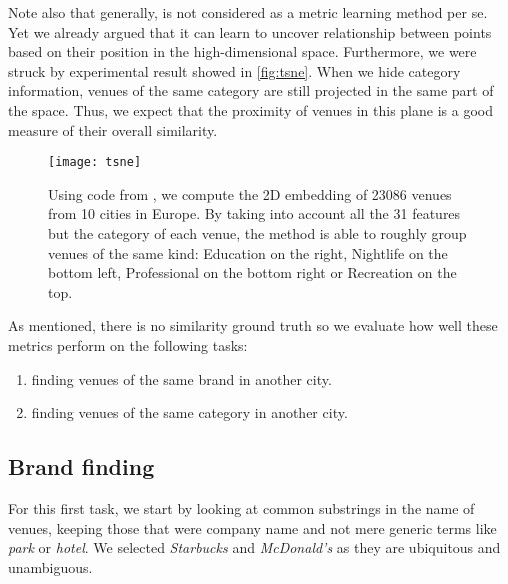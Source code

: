 Note also that generally, \tsne{} is not considered as a metric learning method
per se. Yet we already argued that it can learn to uncover relationship between
points based on their position in the high-dimensional space. Furthermore, we
were struck by experimental result showed in \autoref{fig:tsne}. When we hide
category information, venues of the same category are still projected in the
same part of the space. Thus, we expect that the proximity of venues in this
plane is a good measure of their overall similarity.

\begin{figure}[htpb]
	\centering
	\texttt{[image: tsne]}
	\caption[2D projection of European venues by t-SNE]{Using code from
		\cite{BarnesHut13}, we compute the 2D embedding of 23086 venues from 10 cities in
		Europe. By taking into account all the 31 features but the category of each
		venue, the method is able to roughly group venues of the same kind: Education
		on the right, Nightlife on the bottom left, Professional on the bottom right
	or Recreation on the top. \label{fig:tsne}}
\end{figure}

As mentioned, there is no similarity ground truth so we evaluate how well these
metrics perform on the following tasks:
\begin{enumerate}
	\item finding venues of the same brand in another city.
	\item finding venues of the same category in another city.
\end{enumerate}		

\subsection{Brand finding}
\label{sub:brand_finding}

For this first task, we start by looking at common substrings in the name of
venues, keeping those that were company name and not mere generic terms like
\emph{park} or \emph{hotel}. We selected \emph{Starbucks} and \emph{McDonald's}
as they are ubiquitous and unambiguous.


